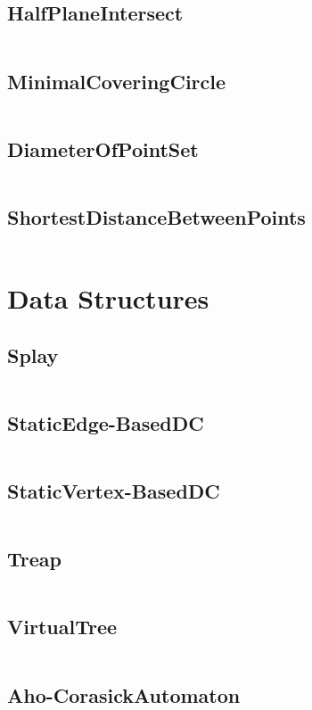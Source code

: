   \subsection{HalfPlaneIntersect}
    \inputminted{cpp}{src/3_Geometry/3_HalfPlaneIntersect.cpp}
  \subsection{MinimalCoveringCircle}
    \inputminted{cpp}{src/3_Geometry/4_MinimalCoveringCircle.cpp}
  \subsection{DiameterOfPointSet}
    \inputminted{cpp}{src/3_Geometry/5_DiameterOfPointSet.cpp}
  \subsection{ShortestDistanceBetweenPoints}
    \inputminted{cpp}{src/3_Geometry/6_ShortestDistanceBetweenPoints.cpp}
\section{Data Structures}
  \subsection{Splay}
    \inputminted{cpp}{src/4_Data Structures/10_Splay.cpp}
  \subsection{StaticEdge-BasedDC}
    \inputminted{cpp}{src/4_Data Structures/11_StaticEdge-BasedDC.cpp}
  \subsection{StaticVertex-BasedDC}
    \inputminted{cpp}{src/4_Data Structures/12_StaticVertex-BasedDC.cpp}
  \subsection{Treap}
    \inputminted{cpp}{src/4_Data Structures/13_Treap.cpp}
  \subsection{VirtualTree}
    \inputminted{cpp}{src/4_Data Structures/14_VirtualTree.cpp}
  \subsection{Aho-CorasickAutomaton}
    \inputminted{cpp}{src/4_Data Structures/1_Aho-CorasickAutomaton.cpp}
